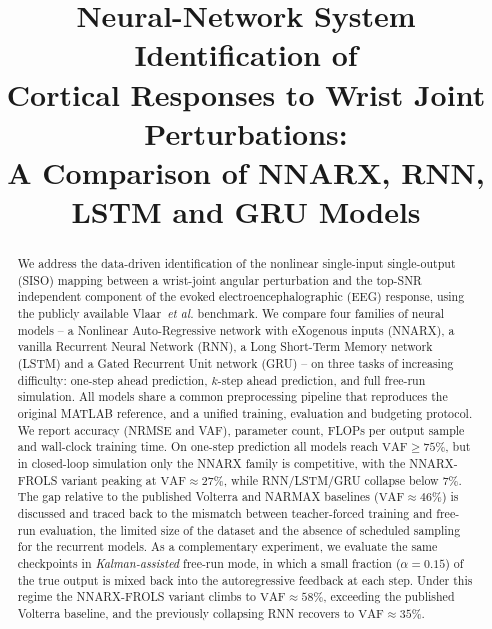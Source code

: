 \documentclass[conference]{IEEEtran}
\begin{document}
\title{Neural-Network System Identification of\\
       Cortical Responses to Wrist Joint Perturbations:\\
       A Comparison of NNARX, RNN, LSTM and GRU Models}

\author{
}

\maketitle

\begin{abstract}
We address the data-driven identification of the nonlinear single-input
single-output (SISO) mapping between a wrist-joint angular perturbation
and the top-SNR independent component of the evoked
electroencephalographic (EEG) response, using the publicly available
Vlaar~\textit{et al.} benchmark.
We compare four families of neural models -- a Nonlinear Auto-Regressive
network with eXogenous inputs (NNARX), a vanilla Recurrent Neural Network
(RNN), a Long Short-Term Memory network (LSTM) and a Gated Recurrent
Unit network (GRU) -- on three tasks of increasing difficulty: one-step
ahead prediction, $k$-step ahead prediction, and full free-run
simulation. All models share a common preprocessing pipeline that
reproduces the original MATLAB reference, and a unified training,
evaluation and budgeting protocol. We report accuracy
(NRMSE and VAF), parameter count, FLOPs per output sample and wall-clock
training time. On one-step prediction all models reach
$\mathrm{VAF}\geq 75\%$, but in closed-loop simulation only the NNARX
family is competitive, with the NNARX-FROLS variant peaking at
$\mathrm{VAF}\approx 27\%$, while RNN/LSTM/GRU collapse below $7\%$.
The gap relative to the published Volterra and NARMAX baselines
($\mathrm{VAF}\approx 46\%$) is discussed and traced back to the
mismatch between teacher-forced training and free-run evaluation, the
limited size of the dataset and the absence of scheduled sampling for
the recurrent models.
As a complementary experiment, we evaluate the same checkpoints in
\emph{Kalman-assisted} free-run mode, in which a small fraction
($\alpha=0.15$) of the true output is mixed back into the
autoregressive feedback at each step. Under this regime the
NNARX-FROLS variant climbs to $\mathrm{VAF}\approx 58\%$, exceeding
the published Volterra baseline, and the previously collapsing RNN
recovers to $\mathrm{VAF}\approx 35\%$.
\end{abstract}
\end{document}
